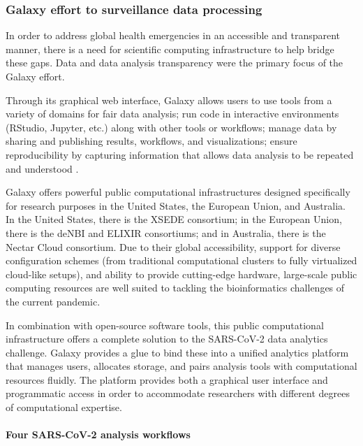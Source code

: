         \subsubsection{Galaxy effort to surveillance data processing} \label{sec:intro:galaxy-effort}
        
        In order to address global health emergencies in an accessible and transparent manner, there is a need for scientific computing infrastructure to help bridge these gaps. Data and data analysis transparency were the primary focus of the Galaxy effort.

        Through its graphical web interface, Galaxy allows users to use tools from a variety of domains for \acrshort{fair} \cite{wilkinson2016} data analysis; run code in interactive environments (RStudio, Jupyter, etc.) along with other tools or workflows; manage data by sharing and publishing results, workflows, and visualizations; ensure reproducibility by capturing information that allows data analysis to be repeated and understood \cite{baker2020}.
        
        Galaxy offers powerful public computational infrastructures designed specifically for research purposes in the United States, the European Union, and Australia. In the United States, there is the XSEDE \cite{towns2014} consortium; in the European Union, there is the deNBI \cite{elixirde} and ELIXIR \cite{elixir2,elixir} consortiums; and in Australia, there is the Nectar Cloud consortium. Due to their global accessibility, support for diverse configuration schemes (from traditional computational clusters to fully virtualized cloud-like setups), and ability to provide cutting-edge hardware, large-scale public computing resources are well suited to tackling the bioinformatics challenges of the current pandemic. 
        
        In combination with open-source software tools, this public computational infrastructure offers a complete solution to the SARS-CoV-2 data analytics challenge. Galaxy provides a glue to bind these into a unified analytics platform that manages users, allocates storage, and pairs analysis tools with computational resources fluidly. The platform provides both a graphical user interface and programmatic access in order to accommodate researchers with different degrees of computational expertise. 

        \paragraph{Four SARS-CoV-2 analysis workflows} 
        
